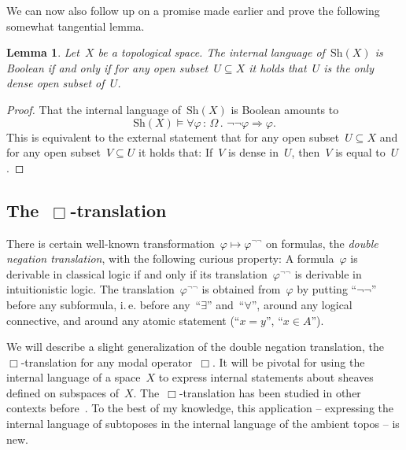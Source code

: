 \documentclass[10pt]{amsart}
\makeatletter
\theoremstyle{definition}
\theoremstyle{plain}
\newtheorem{lemma}[defn]{Lemma}
\theoremstyle{remark}
\newcommand{\Sh}{\mathrm{Sh}}
\newcommand{\?}{\,{:}\,}
\renewcommand{\_}{\mathpunct{.}\,}
\newcommand{\ie}{i.\,e.\@\xspace}
\makeatother
\begin{document}
We can now also follow up on a promise made earlier and prove the following
somewhat tangential lemma.
\begin{lemma}\label{lemma:boolean-dense}
Let~$X$ be a topological space. The internal language of~$\Sh(X)$ is Boolean if
and only if for any open subset~$U \subseteq X$ it holds that~$U$ is the only
dense open subset of~$U$.
\end{lemma}
\begin{proof}That the internal language of~$\Sh(X)$ is Boolean amounts to
\[ \Sh(X) \models \forall \varphi\?\Omega\_ \neg\neg\varphi \Rightarrow
\varphi. \]
This is equivalent to the external statement that for any open subset~$U
\subseteq X$ and for any open subset~$V \subseteq U$ it holds that: If~$V$ is
dense in~$U$, then~$V$ is equal to~$U$.
\end{proof}


\subsection{\texorpdfstring{The~$\Box$-translation}{The □-translation}}
There is certain well-known transformation~$\varphi
\mapsto \varphi^{\neg\neg}$ on formulas, the \emph{double negation
translation}, with the following curious property: A formula~$\varphi$ is
derivable in classical logic if and only if its
translation~$\varphi^{\neg\neg}$ is derivable in intuitionistic logic. The
translation~$\varphi^{\neg\neg}$ is obtained from~$\varphi$ by putting
``$\neg\neg$'' before any subformula, \ie before any~``$\exists$''
and~``$\forall$'', around any logical connective, and around any atomic
statement (``$x=y$'', ``$x \in A$'').

We will describe a slight generalization of the double negation translation,
the~$\Box$-translation for any modal operator~$\Box$. It will be pivotal
for using the internal language of a space~$X$ to express internal statements
about sheaves defined on subspaces of~$X$. The~$\Box$-translation has been studied
in other contexts
before~\cite{aczel:russell-prawitz,escardo:oliva:peirce-shift}. To the best of
my knowledge, this application -- expressing the internal language of
subtoposes in the internal language of the ambient topos -- is new.
\end{document}
